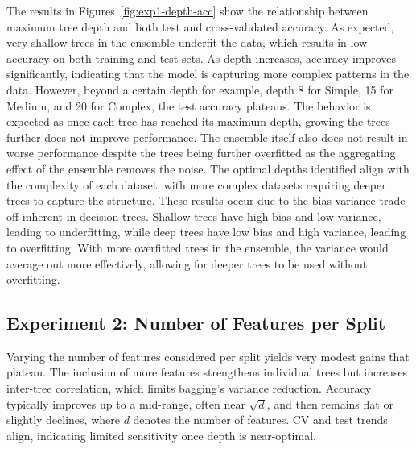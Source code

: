 \documentclass[conference]{IEEEtran}
\begin{document}
 The results in Figures~\ref{fig:exp1-depth-acc} show the relationship between maximum tree depth and both test and cross-validated accuracy. As expected, very shallow trees in the ensemble underfit the data, which results in low accuracy on both training and test sets. As depth increases, accuracy improves significantly, indicating that the model is capturing more complex patterns in the data. However, beyond a certain depth for example,  depth 8 for Simple, 15 for Medium, and 20 for Complex, the test accuracy plateaus. The behavior is expected as once each tree has reached its maximum depth, growing the trees further does not improve performance. The ensemble itself also does not result in worse performance despite the trees being further overfitted as the aggregating effect of the ensemble removes the noise. The optimal depths identified align with the complexity of each dataset, with more complex datasets requiring deeper trees to capture the structure. These results occur due to the bias-variance trade-off inherent in decision trees. Shallow trees have high bias and low variance, leading to underfitting, while deep trees have low bias and high variance, leading to overfitting. With more overfitted trees in the ensemble, the variance would average out more effectively, allowing for deeper trees to be used without overfitting.

\subsection{Experiment 2: Number of Features per Split}

Varying the number of features considered per split yields very modest gains that plateau. The inclusion of more features strengthens individual trees but increases inter-tree correlation, which limits bagging's variance reduction. Accuracy typically improves up to a mid-range, often near $\sqrt{d}$, and then remains flat or slightly declines, where $d$ denotes the number of features. CV and test trends align, indicating limited sensitivity once depth is near-optimal.
\end{document}
